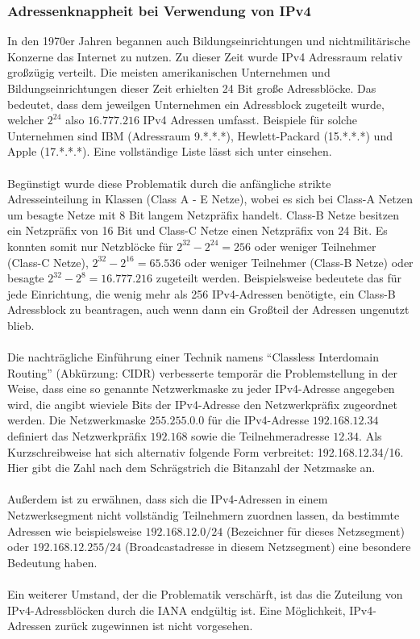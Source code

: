 \documentclass[a4paper,12pt]{scrartcl}
\begin{document}
\subsubsection{Adressenknappheit bei Verwendung von IPv4}
In den 1970er Jahren begannen auch Bildungseinrichtungen und nichtmilit\"arische Konzerne das Internet zu nutzen.
Zu dieser Zeit wurde IPv4 Adressraum relativ gro\ss{}z\"ugig verteilt. Die meisten amerikanischen Unternehmen und Bildungseinrichtungen dieser Zeit erhielten 24 Bit gro\ss{}e Adressbl\"ocke. Das bedeutet, dass dem jeweilgen Unternehmen ein Adressblock zugeteilt wurde, welcher $2^{24}$ also $16.777.216$ IPv4 Adressen umfasst. Beispiele f\"ur solche Unternehmen sind IBM (Adressraum 9.*.*.*), Hewlett-Packard (15.*.*.*) und Apple (17.*.*.*). Eine vollst\"andige Liste l\"asst sich unter \cite{ianaipv4list} einsehen.\\
\\
Beg\"unstigt wurde diese Problematik durch die anf\"angliche strikte Adresseinteilung in Klassen (Class A - E Netze), wobei es sich bei Class-A Netzen um besagte Netze mit 8 Bit langem Netzpr\"afix handelt. Class-B Netze besitzen ein Netzpr\"afix von 16 Bit und Class-C Netze einen Netzpr\"afix von 24 Bit. Es konnten somit nur Netzbl\"ocke f\"ur $2^{32} - 2^{24} = 256$ oder weniger Teilnehmer (Class-C Netze), $2^{32} - 2^{16} = 65.536$ oder weniger Teilnehmer (Class-B Netze) oder besagte $2^{32} - 2^{8} = 16.777.216$ zugeteilt werden. Beispielsweise bedeutete das f\"ur jede Einrichtung, die wenig mehr als 256 IPv4-Adressen ben\"otigte, ein Class-B Adressblock zu beantragen, auch wenn dann ein Gro\ss{}teil der Adressen ungenutzt blieb.\\
\\
Die nachtr\"agliche Einf\"uhrung einer Technik namens "`Classless Interdomain Routing"' (Abk\"urzung: CIDR) verbesserte temporär die Problemstellung in der Weise, dass eine so genannte Netzwerkmaske zu jeder IPv4-Adresse angegeben wird, die angibt wieviele Bits der IPv4-Adresse den Netzwerkpr\"afix zugeordnet werden. Die Netzwerkmaske $255.255.0.0$ f\"ur die IPv4-Adresse $192.168.12.34$ definiert das Netzwerkpr\"afix $192.168$ sowie die Teilnehmeradresse $12.34$. Als Kurzschreibweise hat sich alternativ folgende Form verbreitet: 192.168.12.34/16. Hier gibt die Zahl nach dem Schr\"agstrich die Bitanzahl der Netzmaske an.\\
\\
Au\ss{}erdem ist zu erw\"ahnen, dass sich die IPv4-Adressen in einem Netzwerksegment nicht vollst\"andig Teilnehmern zuordnen lassen, da bestimmte Adressen wie beispielsweise $192.168.12.0/24$ (Bezeichner f\"ur dieses Netzsegment) oder $192.168.12.255/24$ (Broadcastadresse in diesem Netzsegment) eine besondere Bedeutung haben. \\
\\
Ein weiterer Umstand, der die Problematik versch\"arft, ist das die Zuteilung von IPv4-Adressbl\"ocken durch die IANA endg\"ultig ist. Eine M\"oglichkeit, IPv4-Adressen zur\"uck zugewinnen ist nicht vorgesehen. 
\end{document}
